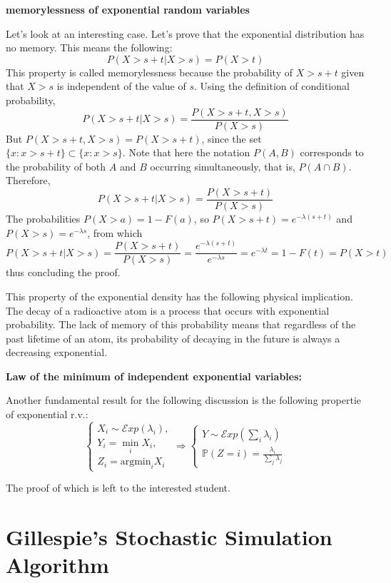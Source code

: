 {\bf memorylessness of exponential random variables}

Let's look at an interesting case. Let's prove that the exponential distribution has no memory. This means the following:
\[P(X> s+t | X>s) = P(X>t)
\]
This property is called memorylessness because the probability of $X>s+t$ given that $X>s$ is independent of the value of $s$. Using the definition of conditional probability,
\[P(X> s+t | X>s) = \frac {P(X> s+t, X>s)}{ P(X>s)}  
\]
But $P(X> s+t, X>s) = P(X> s+t ) $, since the set $\{x:x>s+t\} \subset \{x:x>s\}$. Note that here the notation $P(A,B)$ corresponds to the probability of both $A$ and $B$ occurring simultaneously, that is, $P(A\cap B)$. Therefore,
\[P(X> s+t | X>s) = \frac {P(X> s+t)} {P(X>s)}  
\]
The probabilities $P(X>a) = 1 - F(a)$, so $P(X>s+t)  =  e^{-\lambda (s+t)} $ and $P(X>s)  =  e^{- \lambda s}$, from which
\[P(X> s+t | X>s) = \frac {P(X> s+t)}{ P(X>s)}  = \frac {e^{- \lambda(s+t)}} {e^{-\lambda s}}  =  e^{-\lambda  t } = 1-F(t) = P(X>t)\]
thus concluding the proof.

This property of the exponential density has the following physical implication. The decay of a radioactive atom is a process that occurs with exponential probability. The lack of memory of this probability means that regardless of the past lifetime of an atom, its probability of decaying in the future is always a decreasing exponential.

{\bf Law of the minimum of independent exponential variables:}

Another fundamental result for the following discussion is the following propertie of exponential r.v.:
\begin{equation*}
\begin{cases}
X_i \sim \mathcal Exp(\lambda_i), \\
Y_i=\min_i X_i, \\ Z_i = 
\text{argmin}_i X_i 
\end{cases}
\Rightarrow
\begin{cases}
Y \sim \mathcal Exp(\sum_i \lambda_i) \\
\mathbb P(Z=i) = \frac{\lambda_i}{\sum_j \lambda_j}
\end{cases}
\end{equation*}

The proof of which is left to the interested student.


\section{Gillespie's Stochastic Simulation Algorithm}

